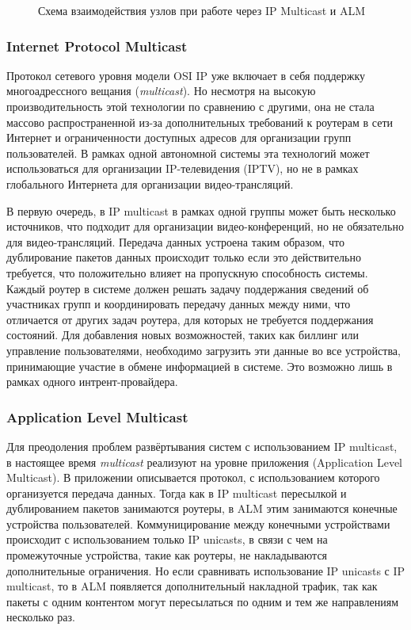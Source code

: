 	\begin{figure}[h]
		\caption{Схема взаимодействия узлов при работе через IP Multicast и ALM}
		\label{img:ip-multicast-vs-application-multicast}
	\end{figure}

		\subsubsection{Internet Protocol Multicast}
		Протокол сетевого уровня модели OSI IP уже включает в себя поддержку многоадрессного вещания
		(\textit{multicast}). Но несмотря на высокую производительность этой технологии по сравнению с другими, она не
		стала массово распространенной из-за дополнительных требований к роутерам в сети Интернет и ограниченности
		доступных адресов для организации групп пользователей. В рамках одной автономной системы эта технологий может
		использоваться для организации IP-телевидения (IPTV), но не в рамках глобального Интернета для организации
		видео-трансляций.

		В первую очередь, в IP multicast в рамках одной группы может быть несколько источников, что подходит
		для организации видео-конференций, но не обязательно для видео-трансляций. Передача данных устроена таким
		образом, что дублирование пакетов данных происходит только если это действительно требуется, что положительно
		влияет на пропускную способность системы. Каждый роутер в системе должен решать задачу поддержания сведений об
		участниках групп и координировать передачу данных между ними, что отличается от других задач роутера, для
		которых не требуется поддержания состояний. Для добавления новых возможностей, таких как биллинг или управление
		пользователями, необходимо загрузить эти данные во все устройства, принимающие участие в обмене информацией в
		системе. Это возможно лишь в рамках одного интрент-провайдера.

		\subsubsection{Application Level Multicast}
		Для преодоления проблем развёртывания систем с использованием IP multicast, в настоящее время \textit{multicast}
		реализуют на уровне приложения (Application Level Multicast). В приложении описывается протокол, с
		использованием которого организуется передача данных. Тогда как в IP multicast пересылкой и дублированием
		пакетов занимаются роутеры, в ALM этим занимаются конечные устройства пользователей. Коммуницирование между
		конечными устройствами происходит с использованием только IP unicasts, в связи с чем на промежуточные устройства,
		такие как роутеры, не накладываются дополнительные ограничения. Но если сравнивать использование IP unicasts с
		IP multicast, то в ALM появляется дополнительный накладной трафик, так как пакеты с одним контентом могут
		пересылаться по одним и тем же направлениям несколько раз.

